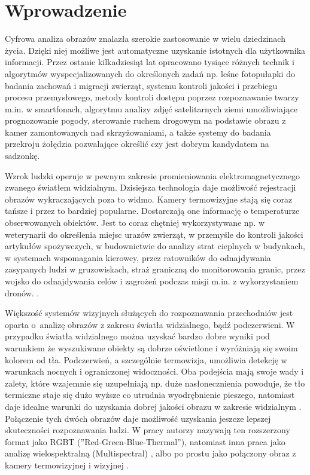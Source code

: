 \chapter{Wprowadzenie}

Cyfrowa analiza obrazów znalazła szerokie zastosowanie w wielu dziedzinach życia. 
Dzięki niej możliwe jest automatyczne uzyskanie istotnych dla użytkownika informacji. 
Przez ostanie kilkadziesiąt lat opracowano tysiące różnych technik i algorytmów wyspecjalizowanych do określonych zadań np. leśne fotopułapki do badania zachowań i migracji zwierząt, systemu kontroli jakości i przebiegu procesu przemysłowego, metody kontroli dostępu poprzez rozpoznawanie twarzy m.in. w smartfonach, algorytmu analizy zdjęć satelitarnych ziemi umożliwiające prognozowanie pogody, sterowanie ruchem drogowym na podstawie obrazu z kamer zamontowanych nad skrzyżowaniami, a także systemy do badania przekroju żołędzia pozwalające określić czy jest dobrym kandydatem na sadzonkę.


Wzrok ludzki operuje w pewnym zakresie promieniowania elektromagnetycznego zwanego światłem widzialnym. 
Dzisiejsza technologia daje możliwość rejestracji obrazów wykraczających poza to widmo. 
Kamery termowizyjne stają się coraz tańsze i przez to bardziej popularne. 
Dostarczają one informację o temperaturze obserwowanych obiektów. 
Jest to coraz chętniej wykorzystywane np. w weterynarii do określenia miejsc urazów zwierząt, w przemyśle do kontroli jakości artykułów spożywczych, w budownictwie do analizy strat cieplnych w budynkach, w systemach wspomagania kierowcy, przez ratowników do odnajdywania zasypanych ludzi w gruzowiskach, straż graniczną do monitorowania granic, przez wojsko do odnajdywania celów i zagrożeń podczas misji m.in. z wykorzystaniem dronów. \cite{gade2014thermal}. 

Większość systemów wizyjnych służących do rozpoznawania przechodniów jest oparta o~analizę obrazów z zakresu światła widzialnego, bądź podczerwieni. 
W przypadku światła widzialnego można uzyskać bardzo dobre wyniki pod warunkiem że wyszukiwane obiekty są dobrze oświetlone i wyróżniają się swoim kolorem od tła. 
Podczerwień, a szczególnie termowizja, umożliwia detekcję w warunkach nocnych i ograniczonej widoczności.
Oba podejścia mają swoje wady i zalety, które wzajemnie się uzupełniają np. duże nasłonecznienia powoduje, że tło termiczne staje się dużo wyższe co utrudnia wyodrębnienie pieszego, natomiast daje idealne warunki do uzyskania dobrej jakości obrazu w zakresie widzialnym \cite{lee2015robust}. 
Połączenie tych dwóch obrazów daje możliwość uzyskania jeszcze lepszej skuteczności rozpoznawania ludzi. 
W pracy \cite{st2007combination} autorzy nazywają ten rozszerzony format jako RGBT (''Red-Green-Blue-Thermal''), natomiast inna praca jako analizę wielospektralną (Multispectral) \cite{hwang2015multispectral}, albo po prostu jako połączony obraz z kamery termowizyjnej i wizyjnej \cite{lee2015robust}. 

